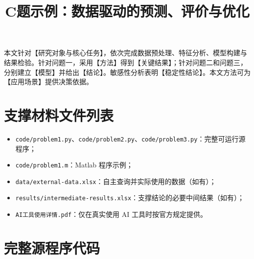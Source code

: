 \documentclass[UTF8,a4paper,zihao=-4]{ctexart}
\title{C题示例：数据驱动的预测、评价与优化}
\begin{document}
\begin{mcmabstract}
本文针对【研究对象与核心任务】，依次完成数据预处理、特征分析、模型构建与结果检验。针对问题一，采用【方法】得到【关键结果】；针对问题二和问题三，分别建立【模型】并给出【结论】。敏感性分析表明【稳定性结论】。本文方法可为【应用场景】提供决策依据。
\end{mcmabstract}

\clearpage













\mcmappendix
\section{支撑材料文件列表}
\begin{itemize}
  \item \texttt{code/problem1.py}、\texttt{code/problem2.py}、\texttt{code/problem3.py}：完整可运行源程序；
  \item \texttt{code/problem1.m}：Matlab 程序示例；
  \item \texttt{data/external-data.xlsx}：自主查询并实际使用的数据（如有）；
  \item \texttt{results/intermediate-results.xlsx}：支撑结论的必要中间结果（如有）；
  \item \texttt{AI工具使用详情.pdf}：仅在真实使用 AI 工具时按官方规定提供。
\end{itemize}

\section{完整源程序代码}
\end{document}
